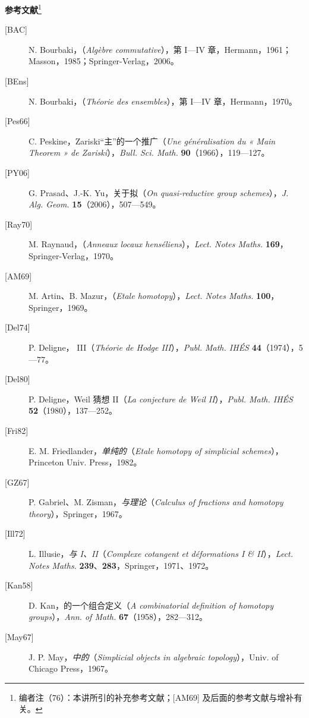 \textbf{参考文献}\footnote{编者注（76）：本讲所引的补充参考文献；[AM69] 及后面的参考文献与增补有关。}
\begin{description}
\item[{[BAC]}] N. Bourbaki，\textit{}（\textit{Algèbre commutative}），第 I—IV 章，Hermann，1961；Masson，1985；Springer-Verlag，2006。
\item[{[BEns]}] N. Bourbaki，\textit{}（\textit{Théorie des ensembles}），第 I—IV 章，Hermann，1970。
\item[{[Pes66]}] C. Peskine，Zariski“主”的一个推广（\textit{Une généralisation du « Main Theorem » de Zariski}），\textit{Bull. Sci. Math.} \textbf{90}（1966），119—127。
\item[{[PY06]}] G. Prasad、J.-K. Yu，关于拟（\textit{On quasi-reductive group schemes}），\textit{J. Alg. Geom.} \textbf{15}（2006），507—549。
\item[{[Ray70]}] M. Raynaud，\textit{}（\textit{Anneaux locaux henséliens}），\textit{Lect. Notes Maths.} \textbf{169}，Springer-Verlag，1970。
\item[{[AM69]}] M. Artin、B. Mazur，\textit{}（\textit{Etale homotopy}），\textit{Lect. Notes Maths.} \textbf{100}，Springer，1969。
\item[{[Del74]}] P. Deligne， III（\textit{Théorie de Hodge III}），\textit{Publ. Math. IHÉS} \textbf{44}（1974），5—77。
\item[{[Del80]}] P. Deligne，Weil 猜想 II（\textit{La conjecture de Weil II}），\textit{Publ. Math. IHÉS} \textbf{52}（1980），137—252。
\item[{[Fri82]}] E. M. Friedlander，\textit{单纯的}（\textit{Etale homotopy of simplicial schemes}），Princeton Univ. Press，1982。
\item[{[GZ67]}] P. Gabriel、M. Zisman，\textit{与理论}（\textit{Calculus of fractions and homotopy theory}），Springer，1967。
\item[{[Ill72]}] L. Illusie，\textit{与 I、II}（\textit{Complexe cotangent et déformations I \& II}），\textit{Lect. Notes Maths.} \textbf{239}、\textbf{283}，Springer，1971、1972。
\item[{[Kan58]}] D. Kan，的一个组合定义（\textit{A combinatorial definition of homotopy groups}），\textit{Ann. of Math.} \textbf{67}（1958），282—312。
\item[{[May67]}] J. P. May，\textit{中的}（\textit{Simplicial objects in algebraic topology}），Univ. of Chicago Press，1967。
\end{description}
